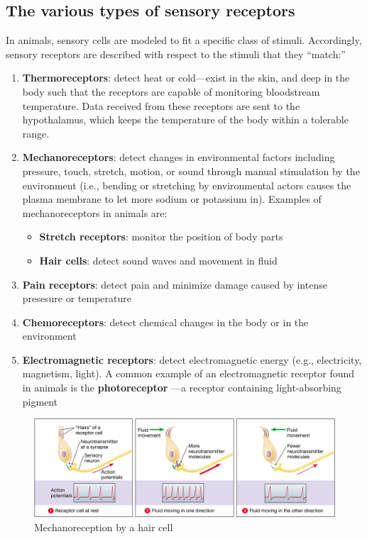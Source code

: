 \documentclass{article}
\begin{document}
\subsection{The various types of sensory receptors}

In animals, sensory cells are modeled to fit a specific class of stimuli.
Accordingly, sensory receptors are described with respect to the stimuli that
they ``match:''

\begin{enumerate}
	\item \textbf{Thermoreceptors}: detect heat or cold---exist in the skin,
		and deep in the body such that the receptors are capable of monitoring
		bloodstream temperature. Data received from these receptors are sent to
		the hypothalamus, which keeps the temperature of the body within a
		tolerable range.
	\item \textbf{Mechanoreceptors}: detect changes in environmental factors
		including pressure, touch, stretch, motion, or sound through manual
		stimulation by the environment (i.e., bending or stretching by
		environmental actors causes the plasma membrane to let more sodium or
		potassium in). Examples of mechanoreceptors in animals are:
		\begin{itemize}
			\item \textbf{Stretch receptors}: monitor the position of body parts
			\item \textbf{Hair cells}: detect sound waves and movement in fluid
		\end{itemize}
	\item \textbf{Pain receptors}: detect pain and minimize damage caused by
		intense presesure or temperature
	\item \textbf{Chemoreceptors}: detect chemical changes in the body or in
		the environment
	\item \textbf{Electromagnetic receptors}: detect electromagnetic energy
		(e.g., electricity, magnetism, light). A common example of an
		electromagnetic receptor found in animals is the \textbf{photoreceptor}
		---a receptor containing light-absorbing pigment
\end{enumerate}

\begin{figure}[h]
	\centering
	\includegraphics[width=0.9\linewidth]{hair_cell.png}
	\caption{Mechanoreception by a hair cell}
\end{figure}
\end{document}
